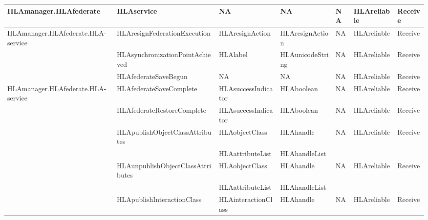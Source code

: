 \begin{landscape}
\begin{momtabletypeset}[8.00]
{{\begin{tabular}{|Y{116.92pt}|Y{137.54pt}|Y{76.22pt}|Y{103.88pt}|Y{65.90pt}|Y{66.32pt}|Y{38.52pt}|}
                    \hline
                    HLAmanager.\allowbreak{}HLAfederate                                   & HLAservice                          & NA                              & NA               & NA          & HLAreliable & Receive \\
                    \hline
                    HLAmanager.\allowbreak{}HLAfederate.\allowbreak{}HLA-\newline service & HLAresignFederationExecution & HLAresignAction & HLAresignAction & NA & HLAreliable & Receive \\
                    & HLAsynchronizationPointAchieved     & HLAlabel                        & HLAunicodeString & NA          & HLAreliable & Receive \\
                    & HLAfederateSaveBegun                & NA                              & NA               & NA          & HLAreliable & Receive \\
                    \hline
                    HLAmanager.\allowbreak{}HLAfederate.\allowbreak{}HLA-\newline service & HLAfederateSaveComplete & HLAsuccessIndicator & HLAboolean & NA & HLAreliable & Receive \\
                    & HLAfederateRestoreComplete          & HLAsuccessIndicator             & HLAboolean       & NA          & HLAreliable & Receive \\
                    & HLApublishObjectClassAttributes     & HLAobjectClass                  & HLAhandle        & NA          & HLAreliable & Receive \\
                    &                                     & HLAattributeList                & HLAhandleList    &             &             &         \\
                    & HLAunpublishObjectClassAttributes   & HLAobjectClass                  & HLAhandle        & NA          & HLAreliable & Receive \\
                    &                                     & HLAattributeList                & HLAhandleList    &             &             &         \\
                    & HLApublishInteractionClass          & HLAinteractionClass             & HLAhandle        & NA          & HLAreliable & Receive \\

\end{tabular}}}
\end{momtabletypeset}
\end{landscape}
